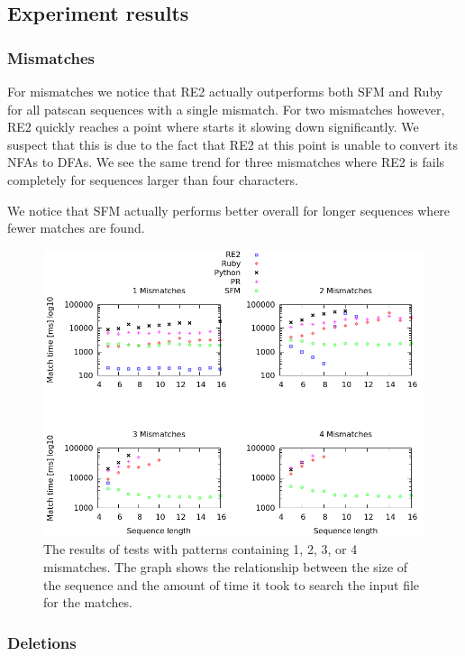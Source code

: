 \documentclass[12pt]{article}
\theoremstyle{definition}
\begin{document}
\subsection{Experiment results}

\subsubsection{Mismatches}

For mismatches we notice that RE2 actually outperforms both SFM and Ruby for all patscan sequences with a single mismatch. For two mismatches however, RE2 quickly reaches a point where starts it slowing down significantly. We suspect that this is due to the fact that RE2 at this point is unable to convert its NFAs to DFAs. We see the same trend for three mismatches where RE2 is fails completely for sequences larger than four characters.

We notice that SFM actually performs better overall for longer sequences where fewer matches are found.

\begin{figure}[H]
	\begin{center}
		\includegraphics[scale=0.55]{graphs/mismatches.png}	
	\end{center}
	\caption{The results of tests with patterns containing 1, 2, 3, or 4 mismatches. The graph shows the relationship between the size of the sequence and the amount of time it took to search the input file for the matches.}
	\label{graph:cases:mismatches}
\end{figure}

\subsubsection{Deletions}
\end{document}
